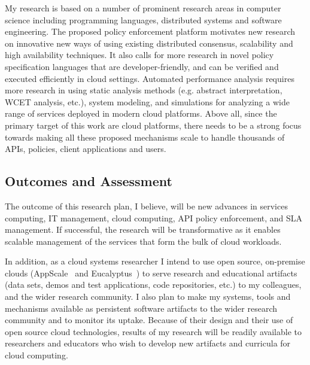 My research is based on a number of prominent research areas in computer
science including programming languages, 
distributed systems and software engineering. The proposed policy enforcement
platform motivates new research on innovative new ways of using existing
distributed consensus, scalability and high availability techniques. It also calls for
more research in novel policy specification languages that
are developer-friendly, and can be verified and executed efficiently in cloud settings.
Automated performance analysis requires more research in using
static analysis methods (e.g. abstract interpretation, WCET analysis, etc.), system modeling,
and simulations for analyzing a wide range of services deployed in modern cloud platforms.
Above all, since the primary target of this
work are cloud platforms, there needs to be a strong focus towards making all these 
proposed mechanisms scale to handle thousands of APIs, policies, client applications and users.

\subsection{Outcomes and Assessment}

The outcome of this research plan,
I believe, will be new advances in services computing, IT management, cloud
computing, API policy enforcement, and SLA management.
If successful, the research will be transformative as it
enables scalable management of the services that form the
bulk of cloud workloads.

In addition,
as a cloud systems researcher I intend to use open source, on-premise clouds (AppScale~\cite{krintzappscale13}
and Eucalyptus~\cite{eucalyptus09}) to serve research and educational artifacts (data sets, demos and test applications, 
code repositories, etc.) to my colleagues, 
and the wider research community.  
I also plan to make my systems, tools and mechanisms available as persistent software artifacts to
the wider research community and to monitor its uptake.  Because of their design
and their use of open source cloud technologies, results of my research will be readily available
to researchers and educators who wish to develop new artifacts and curricula
for cloud computing. 